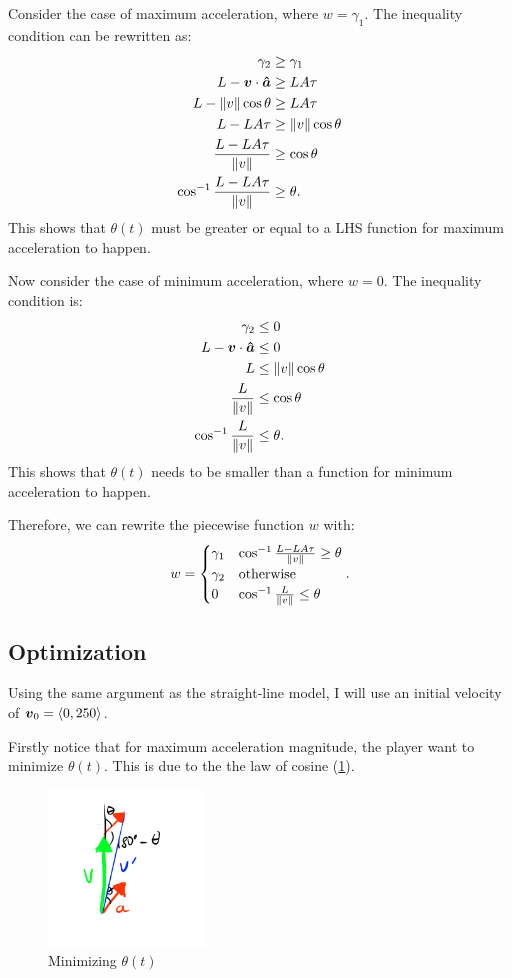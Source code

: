Consider the case of maximum acceleration, where $w=\gamma_1$. The inequality condition can be rewritten as:
\begin{align*}
    \gamma_2 &\ge \gamma_1\\
    L - \boldsymbol{v} \cdot \boldsymbol{\hat{a}} &\ge LA\tau\\
    L - \|v\| \cos \theta &\ge LA \tau\\
    L - LA\tau &\ge \|v\| \cos \theta\\
    \frac{L - LA\tau}{\|v\|} &\ge \cos \theta\\
    \cos^{-1} \frac{L - LA\tau}{\|v\|} &\ge \theta.
\end{align*}
This shows that $\theta(t)$ must be greater or equal to a LHS function for maximum acceleration to happen.

Now consider the case of minimum acceleration, where $w=0$. The inequality condition is:
\begin{align*}
    \gamma_2 &\le 0\\
    L - \boldsymbol{v} \cdot \boldsymbol{\hat{a}} &\le 0\\
    L &\le \|v\| \cos \theta\\
    \frac{L}{\|v\|} &\le \cos \theta\\
    \cos^{-1}  \frac{L}{\|v\|} &\le \theta.
\end{align*}
This shows that $\theta(t)$ needs to be smaller than a function for minimum acceleration to happen.

Therefore, we can rewrite the piecewise function $w$ with:
\[
w = \begin{cases}
    \gamma_1 & \cos^{-1} \frac{L - LA\tau}{\|v\|} \ge \theta\\
    \gamma_2 & \text{otherwise}\\
    0 & \cos^{-1}  \frac{L}{\|v\|} \le \theta
\end{cases}.
\]

\subsection{Optimization}
Using the same argument as the straight-line model, I will use an initial velocity of $\boldsymbol{v}_0 = \left\langle 0, 250 \right\rangle$.

Firstly notice that for maximum acceleration magnitude, the player want to minimize $\theta(t)$. This is due to the the law of cosine (\ref{fig:min_theta}).

\begin{figure}
    \includegraphics[width=0.37\textwidth,right]{assets/min_theta.png}
    \caption{Minimizing $\theta(t)$}
    \label{fig:min_theta}
\end{figure}

